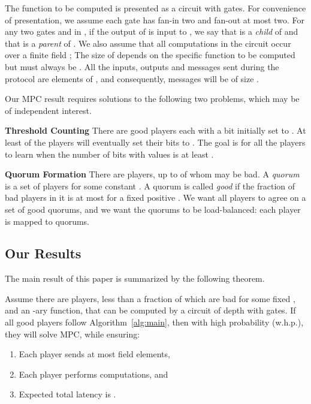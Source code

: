 \documentclass[10pt]{llncs}
\newcommand{\whp}{w.h.p.\xspace}
\begin{document}
The function to be computed is presented as a circuit  with 
gates. For convenience of presentation, we assume each gate has fan-in 
two and fan-out at most two. For any two gates  and  in , if the 
output of  
is input to , we say that  is a \emph{child} of  and
that  is a \emph{parent} of . We also assume that all
computations in the circuit occur over a finite field ; The size of 
 depends on the specific function to be computed but must always be 
. All the inputs,
outputs and messages sent during the protocol are elements of , and 
consequently, messages will be of size .



\smallskip
\noindent
Our MPC result requires solutions to the following two problems, which may be of independent interest.

\smallskip
\noindent
{\bf Threshold Counting}  There are  good players each 
with a bit initially set to . At least  of the
players will eventually set their bits to . The goal is for 
all the players to learn when the number of bits with values  is at least . 


\smallskip
\noindent
{\bf Quorum Formation} There are  players, up to  of whom 
may be bad.
A \emph{quorum} is a set of  players for some constant .  
A quorum is called \emph{good} if the fraction of bad players in it is 
at most  for a fixed positive . We want all  players to agree on a set of  good quorums, and we want the quorums to be load-balanced: each
player is mapped to  quorums.






\subsection{Our Results}



The main result of this paper is summarized by the following theorem.

\begin{theorem} \label{theo:1} 
Assume there are  players, less than a  fraction of which
are bad for some fixed , and an -ary function,  that can be computed by a circuit 
of depth  with  gates. If all good players follow 
Algorithm~\ref{alg:main}, then with high probability (\whp), they will solve MPC, while ensuring:
\begin{enumerate}
\item Each player sends at most 
  field elements,
\item Each player performs  computations, and
\item Expected total latency is .
\end{enumerate}
\end{theorem}
\end{document}
